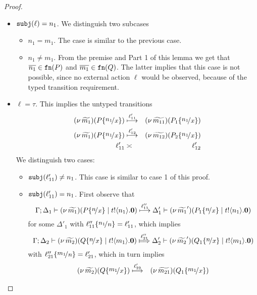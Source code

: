 \begin{proof}
\begin{enumerate}[1.]
\begin{itemize}
					\item	$\mathtt{subj}(\ell) = n_1$. We distinguish two subcases
							\begin{itemize}
								\item	$n_1 = m_1$. The case is similar to the previous case.
								\item	$n_1 \not= m_1$.
										From the premise and Part 1 of this lemma we get
										that $\overline{n_1} \in \mathtt{fn}(P)$ and $\overline{m_1} \in \mathtt{fn}(Q)$.
										The latter implies that this case is not possible, since
										no external action $\ell$ would be observed, because
										of the typed transition requirement.
							\end{itemize}

					\item	$\ell = \tau$. This implies the untyped transitions
							\begin{eqnarray}
								\newsp{\widetilde{m_1}}{P \subst{n_1}{x}} &\hby{\ell_{11}'}& \newsp{\widetilde{m_{11}}}{P_1 \subst{n_1}{x}}
								\label{lem:tr_app_41}\\
								\newsp{\widetilde{m_1}}{P \subst{n_1}{x}} &\hby{\ell_{12}'}& \newsp{\widetilde{m_{12}}}{P_2 \subst{n_1}{x}}
								\label{lem:tr_app_42}\\
								\ell_{11}' &\asymp& \ell_{12}'
							\end{eqnarray}
							We distinguish two cases:
							\begin{itemize}
								\item	$\mathtt{subj}(\ell_{11}') \not= n_1$. This case is similar to case 1 of this proof.
								\item	$\mathtt{subj}(\ell_{11}') = n_1$.
										First observe that
										\[
											\horel{\Gamma}{\Delta_1}{\newsp{\widetilde{m_1}}{P \subst{n}{x} \Par \bout{t}{n_1} \inact}}
											{ \hby{\ell_{11}''} }
											{\Delta_1'}{\newsp{\widetilde{m_1}'}{P_1 \subst{n}{x} \Par \bout{t}{n_1} \inact}}
										\]
										for some $\Delta'_1$
										with $\ell_{11}'' \subst{n_1}{n}  = \ell_{11}' $,
										which implies
										\[
											\horel{\Gamma}{\Delta_2}{\newsp{\widetilde{m_2}}{Q \subst{n}{x} \Par \bout{t}{m_1} \inact}}
											{ \Hby{\ell_{21}''} }
											{\Delta_2'}{\newsp{\widetilde{m_2}'}{Q_1 \subst{n}{x} \Par \bout{t}{m_1} \inact}}
										\]
										with $\ell_{21}'' \subst{m_1}{n}  = \ell_{21}' $,
										which in turn implies
										\begin{eqnarray}
											\newsp{\widetilde{m_2}}{Q \subst{m_1}{x}} &\hby{\ell_{22}'}& \newsp{\widetilde{m_{21}}}{Q_1 \subst{m_1}{x}}

\end{eqnarray}
\end{itemize}
\end{itemize}
\end{enumerate}
\end{proof}
